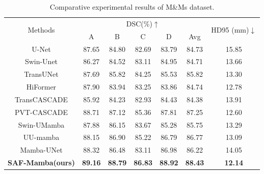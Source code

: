 \documentclass[conference]{IEEEtran}
\begin{document}
\begin{table}[t]
\caption{Comparative experimental results of M\&Ms dataset.}
\label{mms results}
\begin{center}
\setlength{\tabcolsep}{4pt} %
\renewcommand{\arraystretch}{1.1}
\begin{tabular}{ccccccc}
\hline
\multirow{2}{*}{Methods}                                             & \multicolumn{5}{c}{DSC(\%)$\uparrow$}                                              & \multirow{2}{*}{HD95 (mm)$\downarrow$} \\
                                                                     & A              & B              & C              & D              & Avg            &                                        \\ \hline
U-Net\cite{ronnebergerUNetConvolutionalNetworks2015} & 87.65          & 84.80          & 82.69          & 83.79          & 84.73          & 15.85                                  \\
Swin-Unet\cite{SwinUnetUnetlikePure2021a}           & 86.27          & 84.52          & 83.11          & 84.95          & 84.71          & 13.66                                  \\
TransUNet\cite{TransUNetTransformersMake2021}       & 87.69          & 85.82          & 84.25          & 85.53          & 85.82          & 13.30                                  \\ \hline
HiFormer\cite{HiFormerHierarchicalMultiscale2023}   & 87.90          & 83.94          & 83.25          & 83.86          & 84.74          & 12.78                                  \\
TransCASCADE\cite{MedicalImageSegmentation2023}     & 85.92          & 84.23          & 82.93          & 84.43          & 84.38          & 13.91                                  \\
PVT-CASCADE\cite{MedicalImageSegmentation2023}      & 88.71          & 87.12          & 85.36          & 87.81          & 87.25          & 12.60                                  \\ \hline
Swin-UMamba\cite{SwinUMambaMambabasedUNet2024}      & 87.88          & 86.15          & 83.67          & 85.28          & 85.75          & 13.29                                  \\
UU-mamba\cite{UUmambaUncertaintyawareUmamba2024}    & 88.15          & 86.90          & 85.22          & 86.79          & 86.77          & 13.09                                  \\
Mamba-UNet\cite{MambaUNetUNetPureVisual2024}        & 88.32          & 86.48          & 83.11          & 86.98          & 86.22          & 14.05                                  \\ \hline
\textbf{SAF-Mamba(ours)}                                              & \textbf{89.16} & \textbf{88.79} & \textbf{86.83} & \textbf{88.92} & \textbf{88.43} & \textbf{12.14}                         \\ \hline
\end{tabular}
\end{center}
\end{table}
\end{document}
